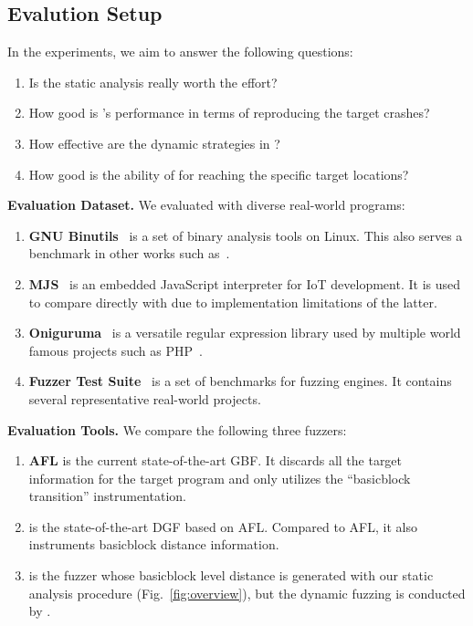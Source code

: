 \subsection{Evalution Setup}\label{subsec:evalsetup}

In the experiments, we aim to answer the following questions:

\begin{enumerate}[\textbf{RQ}1]
    \item  Is the static analysis really worth the effort?
    \item  How good is {\dFOT}'s performance in terms of reproducing the target crashes?
    \item  How effective are the dynamic strategies in {\dFOT}?
    \item  How good is the ability of {\dFOT} for reaching the specific target locations?  
\end{enumerate}

\textbf{Evaluation Dataset.}
We evaluated \dFOT with diverse real-world programs:
\begin{enumerate}[(1)] 
    \item \textbf{GNU Binutils}~\cite{binutils} is a set of binary analysis tools on Linux. 
This also serves a benchmark in other works such as~\cite{Bohme:2016:CGF, Bohme:2017:DGF, FairFuzz}.
    \item \textbf{MJS}~\cite{mjs} is an embedded JavaScript interpreter for IoT development.
    It is used to compare \dFOT directly with {\aflgo} due to implementation limitations of the latter.
    \item \textbf{Oniguruma}~\cite{oniguruma} is a versatile regular expression library used by multiple world famous projects such as PHP~\cite{php}.
    \item \textbf{Fuzzer Test Suite}~\cite{fuzzer-test-suite} is a set of benchmarks for fuzzing engines.
    It contains several representative real-world projects.
\end{enumerate}

\textbf{Evaluation Tools.} We compare the following three fuzzers:
\begin{enumerate}[(1)] 
\item \textbf{AFL} is the current state-of-the-art GBF. It discards all the target information for the target program and only utilizes the ``basicblock transition'' instrumentation.
\item \textbf{{\aflgo}} is the state-of-the-art DGF based on AFL.
Compared to AFL, it also instruments basicblock distance information.
\item \textbf{{\dGO}} is the fuzzer whose basicblock level distance is generated with our static analysis procedure (Fig.~\ref{fig:overview}), but the dynamic fuzzing is conducted by {\aflgo}.
\end{enumerate}

